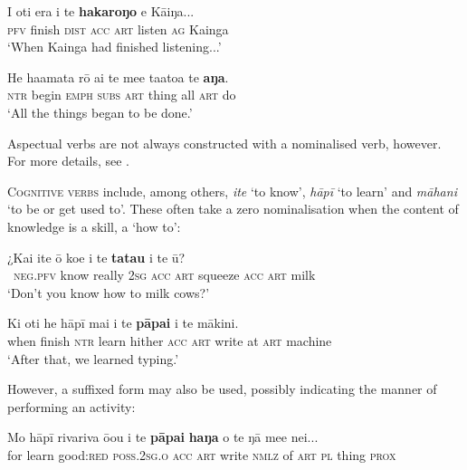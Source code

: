 \ea\label{ex:3.38}
\gll I oti era i te \textbf{hakaroŋo} e Kāiŋa...\\
\textsc{pfv} finish \textsc{dist} \textsc{acc} \textsc{art} listen \textsc{ag} Kainga\\

\glt 
‘When Kainga had finished listening...’ \textstyleExampleref{[R304.011]} 
\z

\ea\label{ex:3.39}
\gll He ha{\ꞌ}amata rō {\ꞌ}ai te me{\ꞌ}e ta{\ꞌ}ato{\ꞌ}a te \textbf{aŋa}.\\
\textsc{ntr} begin \textsc{emph} \textsc{subs} \textsc{art} thing all \textsc{art} do\\

\glt
‘All the things began to be done.’ \textstyleExampleref{[R378.022]} 
\z

Aspectual verbs are not always constructed with a nominalised verb, however. For more details, see .

\textsc{Cognitive verbs} include, among others, \textit{{\ꞌ}ite} ‘to know’, \textit{hāpī} ‘to learn’ and \textit{māhani} ‘to be or get used to’. These often take a zero nominalisation when the content of knowledge is a skill, a ‘how to’: 

\ea\label{ex:3.40}
\gll ¿Kai {\ꞌ}ite {\ꞌ}ō koe i te \textbf{tatau} i te ū?\\
~\textsc{neg.pfv} know really \textsc{2sg} \textsc{acc} \textsc{art} squeeze \textsc{acc} \textsc{art} milk\\

\glt 
‘Don’t you know how to milk cows?’ \textstyleExampleref{[R245.184]} 
\z

\ea\label{ex:3.41}
\gll Ki oti he hāpī mai i te \textbf{pāpa{\ꞌ}i} {\ꞌ}i te mākini.\\
when finish \textsc{ntr} learn hither \textsc{acc} \textsc{art} write at \textsc{art} machine\\

\glt
‘After that, we learned typing.’ \textstyleExampleref{[R206.008]} 
\z

However, a suffixed form may also be used, possibly indicating the manner of performing an activity:

\ea\label{ex:3.42}
\gll Mo hāpī rivariva ō{\ꞌ}ou i te \textbf{pāpa{\ꞌ}i} \textbf{haŋa} o te ŋā me{\ꞌ}e nei...\\
for learn good:\textsc{red} \textsc{poss.2sg.o} \textsc{acc} \textsc{art} write \textsc{nmlz} of \textsc{art} \textsc{pl} thing \textsc{prox}\\

